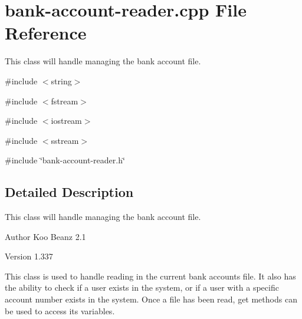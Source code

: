 \hypertarget{bank-account-reader_8cpp}{
\section{bank-\/account-\/reader.cpp File Reference}
\label{bank-account-reader_8cpp}
}


This class will handle managing the bank account file.  


{\ttfamily \#include $<$string$>$}\par
{\ttfamily \#include $<$fstream$>$}\par
{\ttfamily \#include $<$iostream$>$}\par
{\ttfamily \#include $<$sstream$>$}\par
{\ttfamily \#include \char`\"{}bank-\/account-\/reader.h\char`\"{}}\par


\subsection{Detailed Description}
This class will handle managing the bank account file. \begin{DoxyAuthor}{Author}
Koo Beanz 2.1 
\end{DoxyAuthor}
\begin{DoxyVersion}{Version}
1.337
\end{DoxyVersion}
This class is used to handle reading in the current bank accounts file. It also has the ability to check if a user exists in the system, or if a user with a specific account number exists in the system. Once a file has been read, get methods can be used to access its variables. 